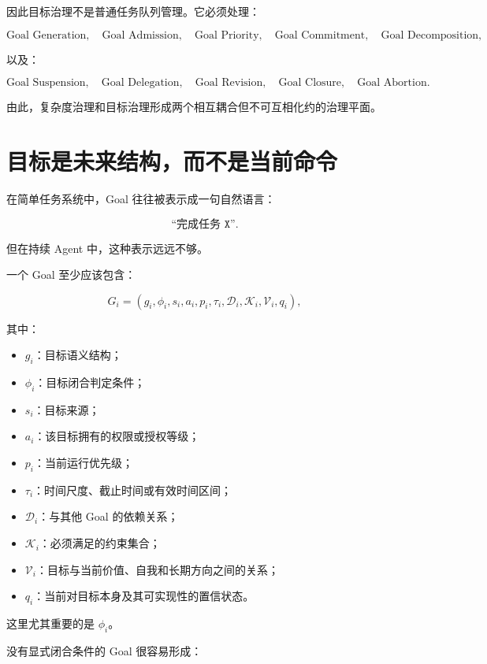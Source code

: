 因此目标治理不是普通任务队列管理。它必须处理：

\[
\text{Goal Generation},
\quad
\text{Goal Admission},
\quad
\text{Goal Priority},
\quad
\text{Goal Commitment},
\quad
\text{Goal Decomposition},
\]

以及：

\[
\text{Goal Suspension},
\quad
\text{Goal Delegation},
\quad
\text{Goal Revision},
\quad
\text{Goal Closure},
\quad
\text{Goal Abortion}.
\]

由此，复杂度治理和目标治理形成两个相互耦合但不可互相化约的治理平面。


\section{目标是未来结构，而不是当前命令}

在简单任务系统中，Goal 往往被表示成一句自然语言：

\[
\texttt{``完成任务 X''}.
\]

但在持续 Agent 中，这种表示远远不够。

一个 Goal 至少应该包含：

\[
\boxed{
G_i
=
\left(
g_i,
\phi_i,
s_i,
a_i,
p_i,
\tau_i,
\mathcal D_i,
\mathcal K_i,
\mathcal V_i,
q_i
\right),
}
\]

其中：

\begin{itemize}
    \item $g_i$：目标语义结构；
    \item $\phi_i$：目标闭合判定条件；
    \item $s_i$：目标来源；
    \item $a_i$：该目标拥有的权限或授权等级；
    \item $p_i$：当前运行优先级；
    \item $\tau_i$：时间尺度、截止时间或有效时间区间；
    \item $\mathcal D_i$：与其他 Goal 的依赖关系；
    \item $\mathcal K_i$：必须满足的约束集合；
    \item $\mathcal V_i$：目标与当前价值、自我和长期方向之间的关系；
    \item $q_i$：当前对目标本身及其可实现性的置信状态。
\end{itemize}

这里尤其重要的是 $\phi_i$。

没有显式闭合条件的 Goal 很容易形成：

\begin{statementbox}
\centering
{}
\end{statementbox}

